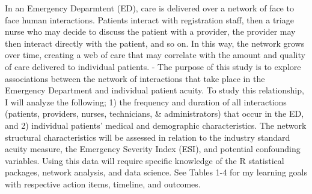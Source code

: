 \documentclass[]{elsarticle} %
\begin{document}
In an Emergency Deparmtent (ED), care is delivered over a network of
face to face human interactions. Patients interact with registration
staff, then a triage nurse who may decide to discuss the patient with a
provider, the provider may then interact directly with the patient, and
so on. In this way, the network grows over time, creating a web of care
that may correlate with the amount and quality of care delivered to
individual patients. - The purpose of this study is to explore
associations between the network of interactions that take place in the
Emergency Department and individual patient acuity. To study this
relationship, I will analyze the following; 1) the frequency and
duration of all interactions (patients, providers, nurses, technicians,
\& administrators) that occur in the ED, and 2) individual patients'
medical and demographic characteristics. The network structural
characteristics will be assessed in relation to the industry standard
acuity measure, the Emergency Severity Index (ESI), and potential
confounding variables. Using this data will require specific knowledge
of the R statistical packages, network analysis, and data science. See
Tables 1-4 for my learning goals with respective action items, timeline,
and outcomes.
\end{document}
